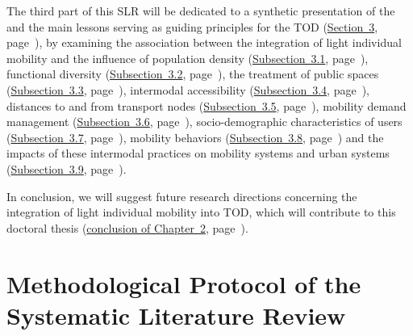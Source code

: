 \begin{refsegment}
The third part of this \acrshort{SLR} will be dedicated to a synthetic presentation of the  and the main lessons serving as guiding principles for the TOD (\hyperref[chap2:caracterisation-btod-environnement-urbain-choix-individuels]{Section~3}, page~\pageref{chap2:caracterisation-btod-environnement-urbain-choix-individuels}), by examining the association between the integration of light individual mobility and the influence of population density (\hyperref[chap2:densite-population]{Subsection~3.1}, page~\pageref{chap2:densite-population}), functional diversity (\hyperref[chap2:diversite-fonctionnelle]{Subsection~3.2}, page~\pageref{chap2:diversite-fonctionnelle}), the treatment of public spaces (\hyperref[chap2:traitement-espaces-publics]{Subsection~3.3}, page~\pageref{chap2:traitement-espaces-publics}), intermodal accessibility (\hyperref[chap2:accessibilite-intermodale]{Subsection~3.4}, page~\pageref{chap2:accessibilite-intermodale}), distances to and from transport nodes (\hyperref[chap2:distances-premiers-derniers-km]{Subsection~3.5}, page~\pageref{chap2:distances-premiers-derniers-km}), mobility demand management (\hyperref[chap2:gestion-demande-mobilite]{Subsection~3.6}, page~\pageref{chap2:gestion-demande-mobilite}), socio-demographic characteristics of users (\hyperref[chap2:sociodemographie-usagers]{Subsection~3.7}, page~\pageref{chap2:sociodemographie-usagers}), mobility behaviors (\hyperref[chap2:comportements-mobilite]{Subsection~3.8}, page~\pageref{chap2:comportements-mobilite}) and the impacts of these intermodal practices on mobility systems and urban systems (\hyperref[chap2:impacts-systemes-urbain-mobilite]{Subsection~3.9}, page~\pageref{chap2:impacts-systemes-urbain-mobilite}).%

In conclusion, we will suggest future research directions concerning the integration of light individual mobility into \acrshort{TOD}, which will contribute to this doctoral thesis (\hyperref[chap2:conclusion]{conclusion of Chapter~2}, page~\pageref{chap2:conclusion}).%

    \newpage
\section{Methodological Protocol of the Systematic Literature Review
    \label{chap2:protocole-methodologique-rsl}
    }
    

\end{refsegment}
